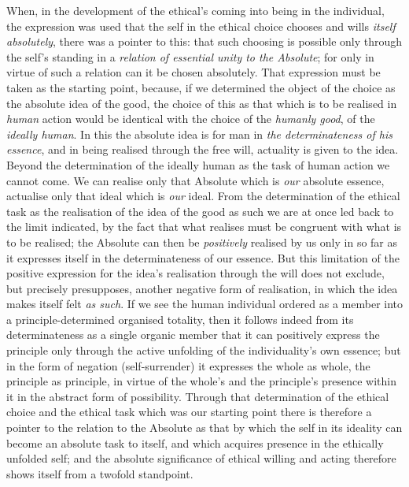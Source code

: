 \documentclass[12pt,a4paper]{book}
\begin{document}
When, in the development of the ethical's coming into being in the individual,
the expression was used that the self in the ethical choice chooses and wills
\emph{itself absolutely}, there was a pointer to this: that such choosing is
possible only through the self's standing in a \emph{relation of essential
unity to the Absolute}; for only in virtue of such a relation can it be chosen
absolutely. That expression must be taken as the starting point, because, if
we determined the object of the choice as the absolute idea of the good, the
choice of this as that which is to be realised in \emph{human} action would be
identical with the choice of the \emph{humanly good}, of the \emph{ideally
human}. In this the absolute idea is for man in \emph{the determinateness of
his essence}, and in being realised through the free will, actuality is given
to the idea. Beyond the determination of the ideally human
as the task of human action we cannot come. We can realise only that Absolute
which is \emph{our} absolute essence, actualise only that ideal which is
\emph{our} ideal. From the determination of the ethical task as the
realisation of the idea of the good as such we are at once led back to the
limit indicated, by the fact that what realises must be congruent with what is
to be realised; the Absolute can then be \emph{positively} realised by us only
in so far as it expresses itself in the determinateness of our essence. But
this limitation of the positive expression for the idea's realisation through
the will does not exclude, but precisely presupposes, another negative form of
realisation, in which the idea makes itself felt \emph{as such}. If we see the
human individual ordered as a member into a principle-determined organised
totality, then it follows indeed from its determinateness as a single organic
member that it can positively express the principle only through the active
unfolding of the individuality's own essence; but in the form of negation
(self-surrender) it expresses the whole as whole, the principle as principle,
in virtue of the whole's and the principle's presence within it in the
abstract form of possibility. Through that determination of the ethical choice
and the ethical task which was our starting point there is therefore a pointer
to the relation to the Absolute as that by which the self in its ideality can
become an absolute task to itself, and which acquires presence in the
ethically unfolded self; and the absolute significance of ethical willing and
acting therefore shows itself from a twofold standpoint.
\end{document}
